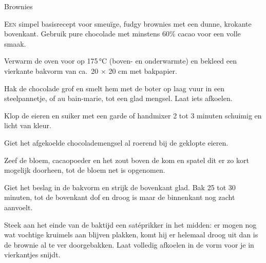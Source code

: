 \begin{recipe}{Brownies}


\lettrine{E}{en} simpel basisrecept voor smeuïge, fudgy brownies met een
dunne, krokante bovenkant. Gebruik pure chocolade met minstens 60\% cacao
voor een volle smaak.

\begin{ingredients}
\end{ingredients}

\begin{steps}
  \item Verwarm de oven voor op 175\,°C (boven- en onderwarmte) en bekleed
        een vierkante bakvorm van ca.\ 20 × 20 cm met bakpapier.
  \item Hak de chocolade grof en smelt hem met de boter op laag vuur in een
        steelpannetje, of au bain-marie, tot een glad mengsel. Laat iets afkoelen.
  \item Klop de eieren en suiker met een garde of handmixer 2 tot 3 minuten
        schuimig en licht van kleur.
  \item Giet het afgekoelde chocolademengsel al roerend bij de geklopte eieren.
  \item Zeef de bloem, cacaopoeder en het zout boven de kom en spatel dit er zo kort
        mogelijk doorheen, tot de bloem net is opgenomen.
  \item Giet het beslag in de bakvorm en strijk de bovenkant glad. Bak 25 tot 30
        minuten, tot de bovenkant dof en droog is maar de binnenkant nog zacht aanvoelt.
  \item Steek aan het einde van de baktijd een satéprikker in het midden: er mogen
        nog wat vochtige kruimels aan blijven plakken, komt hij er helemaal droog uit
        dan is de brownie al te ver doorgebakken. Laat volledig afkoelen in de vorm
        voor je in vierkantjes snijdt.
\end{steps}
\end{recipe}
